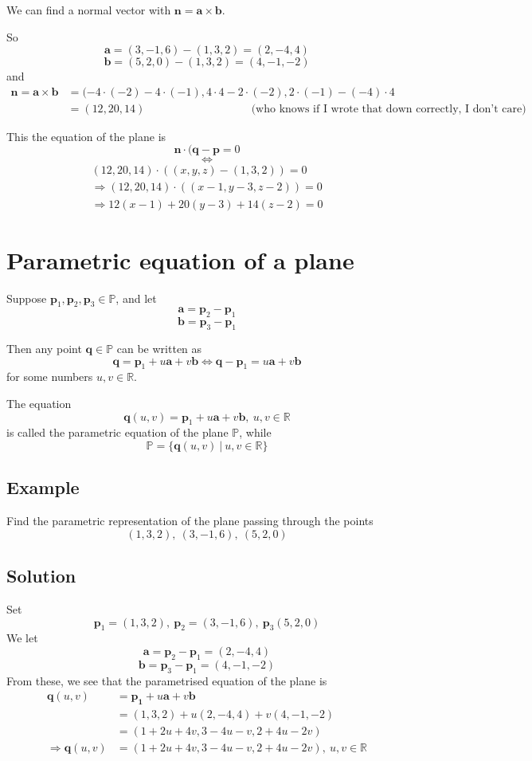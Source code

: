 \documentclass[11pt]{article}
\newcommand{\reals}{\mathbb{R}}
\newcommand{\plane}{\mathbb{P}}
\renewcommand{\vec}[1]{\mathbf{#1}}
\begin{document}
We can find a normal vector with $\vec{n} = \vec{a} \times \vec{b}$.

So
\[ \vec{a} = (3, -1, 6) - (1, 3, 2) = (2, -4, 4) \]
\[ \vec{b} = (5, 2, 0) - (1, 3, 2) = (4, -1, -2) \]
and
\begin{align*}
\vec{n} = \vec{a} \times \vec{b} &= (-4\cdot(-2) - 4 \cdot(-1), 4\cdot4 - 2\cdot(-2), 2\cdot(-1) - (-4)\cdot 4 \\
&= (12, 20, 14) \hspace{4cm} \text{(who knows if I wrote that down correctly, I don't care)}
\end{align*}

This the equation of the plane is
\[ \vec{n} \cdot (\vec{q} - \vec{p} = 0 \]
\[ \Leftrightarrow \]
\begin{align*}
(12, 20, 14) \cdot ((x, y, z) - (1, 3, 2)) = 0 \\
\Rightarrow (12, 20, 14) \cdot ((x-1, y-3, z-2)) = 0 \\
\Rightarrow 12(x-1) + 20(y-3) + 14(z-2) = 0
\end{align*}

\section{Parametric equation of a plane}
Suppose $\vec{p}_1, \vec{p}_2, \vec{p}_3 \in \plane$, and let
\[ \vec{a} = \vec{p}_2 - \vec{p}_1 \]
\[ \vec{b} = \vec{p}_3 - \vec{p}_1 \]

Then any point $\vec{q} \in \plane$ can be written as 
\[ \vec{q} = \vec{p}_1 + u \vec{a} + v\vec{b} \Leftrightarrow \vec{q} - \vec{p}_1 = u \vec{a} + v\vec{b} \]
for some numbers $u, v \in \reals$.

The equation
\[ \vec{q}(u, v) = \vec{p}_1 + u \vec{a} + v\vec{b},\ u, v \in \reals \]
is called the parametric equation of the plane $\plane$, while
\[ \plane = \{ \vec{q}(u, v)\ |\ u,v \in \reals \} \]

\subsection{Example}
Find the parametric representation of the plane passing through the points
\[ (1, 3, 2),\ (3, -1, 6),\ (5, 2, 0) \]

\subsection{Solution}
Set
\[ \vec{p}_1 = (1, 3, 2),\ \vec{p}_2=(3, -1, 6),\ \vec{p}_3(5, 2, 0)\]
We let
\[ \vec{a} = \vec{p}_2 - \vec{p}_1 = (2, -4, 4) \]
\[ \vec{b} = \vec{p}_3 - \vec{p}_1 = (4, -1, -2) \]
From these, we see that the parametrised equation of the plane is
\begin{align*}
\vec{q}(u, v) &= \vec{p_1} + u\vec{a} + v\vec{b} \\
&= (1, 3, 2) + u(2, -4, 4) + v(4, -1, -2) \\
&= (1 + 2u + 4v, 3 - 4u - v, 2 + 4u - 2v) \\
\Rightarrow \vec{q}(u,v) &= (1 + 2u + 4v, 3 - 4u - v, 2 + 4u - 2v),\ u,v \in \reals
\end{align*}
\end{document}
